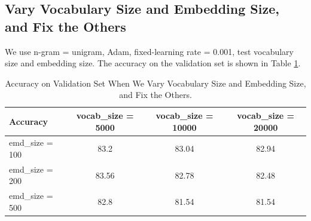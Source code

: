 \documentclass[10pt,a4paper]{article}
\begin{document}
\subsection{Vary Vocabulary Size and Embedding Size,  and Fix the Others}
We use n-gram = unigram, Adam, fixed-learning rate = 0.001, test vocabulary size and embedding size.
The accuracy on the validation set is shown in Table \ref{tab: vocab_emb}.
\begin{table}[!ht]
\centering
\begin{tabular}{|l|c|c|c|}
\hline
Accuracy& 	vocab\_size = 5000 & vocab\_size = 10000 &vocab\_size = 20000 \\ \hline
emd\_size = 100& 83.2 & 83.04 & 82.94\\ \hline
emd\_size = 200 & 83.56 & 82.78 & 82.48\\ \hline
emd\_size = 500 & 82.8 & 81.54 & 81.54 \\ \hline
\end{tabular}
\caption{\label{tab: vocab_emb} Accuracy on Validation Set When We Vary Vocabulary Size and Embedding Size,  and Fix the Others.}
\end{table}
\end{document}
